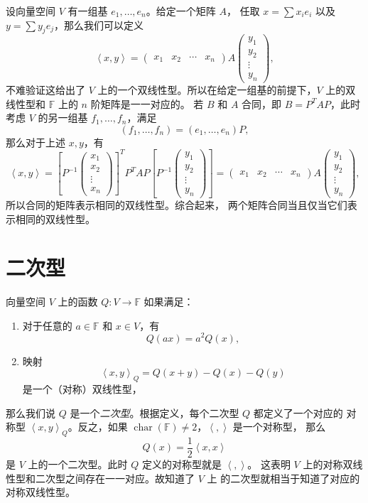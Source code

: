 \documentclass[fontset=none,zihao=-4]{Notes}
\DeclareMathOperator\cha{char}
\newcommand{\inn}[1]{\left\langle#1\right\rangle}
\begin{document}
设向量空间 $V$ 有一组基 $e_1,\dots,e_n$。给定一个矩阵 $A$，
任取 $x=\sum x_ie_i$ 以及 $y=\sum y_je_j$，那么我们可以定义
\[
  \inn{x,y}=    \begin{pmatrix}
    x_1 & x_2 & \cdots & x_n
  \end{pmatrix}A
  \begin{pmatrix}
    y_1 \\ y_2 \\ \vdots \\ y_n
  \end{pmatrix},
\]
不难验证这给出了 $V$ 上的一个双线性型。所以在给定一组基的前提下，$V$
上的双线性型和 $\mathbb{F}$ 上的 $n$ 阶矩阵是一一对应的。
若 $B$ 和 $A$ 合同，即 $B=P^TAP$，此时考虑 $V$ 的另一组基
$f_1,\dots,f_n$，满足
\[
  (f_1,\dots,f_n)=(e_1,\dots,e_n)P,
\]
那么对于上述 $x,y$，有
\[
  \inn{x,y}=  \left[P^{-1}\begin{pmatrix}
    x_1 \\x_2 \\ \vdots \\ x_n
  \end{pmatrix}\right]^T P^TAP\left[
    P^{-1} \begin{pmatrix}
      y_1 \\ y_2 \\ \vdots \\ y_n
    \end{pmatrix}\right]=\begin{pmatrix}
      x_1 & x_2 & \cdots & x_n
    \end{pmatrix}A
    \begin{pmatrix}
      y_1 \\ y_2 \\ \vdots \\ y_n
    \end{pmatrix},
\]
所以合同的矩阵表示相同的双线性型。综合起来，
两个矩阵合同当且仅当它们表示相同的双线性型。

\section{二次型}

向量空间 $V$ 上的函数 $Q:V\to\mathbb{F}$ 如果满足：
\begin{enumerate}
  \item 对于任意的 $a\in\mathbb{F}$ 和 $x\in V$，有
  \[
    Q(ax)=a^2Q(x),  
  \]
  \item 映射
  \[
    \inn{x,y}_Q=Q(x+y)-Q(x)-Q(y)
  \]
  是一个（对称）双线性型，
\end{enumerate}
那么我们说 $Q$ 是一个\emph{二次型}。根据定义，每个二次型 $Q$ 都定义了一个对应的
对称型 $\inn{x,y}_Q$。反之，如果 $\cha(\mathbb{F})\neq 2$，$\inn{,}$ 是一个对称型，
那么
\[
  Q(x)=\frac{1}{2}\inn{x,x}  
\]
是 $V$ 上的一个二次型。此时 $Q$ 定义的对称型就是 $\inn{,}$。
这表明 $V$ 上的对称双线性型和二次型之间存在一一对应。故知道了 $V$ 上
的二次型就相当于知道了对应的对称双线性型。
\end{document}
